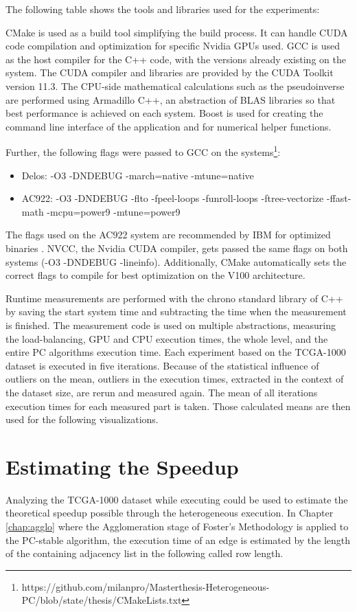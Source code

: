 The following table shows the tools and libraries used for the experiments:


CMake is used as a build tool simplifying the build process. It can handle CUDA code compilation and optimization for specific Nvidia GPUs used. GCC is used as the host compiler for the C++ code, with the versions already existing on the system. The CUDA compiler and libraries are provided by the CUDA Toolkit version 11.3. The CPU-side mathematical calculations such as the pseudoinverse are performed using Armadillo C++, an abstraction of BLAS libraries so that best performance is achieved on each system. Boost is used for creating the command line interface of the application and for numerical helper functions.

Further, the following flags were passed to GCC on the systems\footnote{https://github.com/milanpro/Masterthesis-Heterogeneous-PC/blob/state/thesis/CMakeLists.txt}:
\begin{itemize}
  \item Delos: -O3 -DNDEBUG -march=native -mtune=native
  \item AC922: -O3 -DNDEBUG -flto -fpeel-loops -funroll-loops -ftree-vectorize -ffast-math -mcpu=power9 -mtune=power9
\end{itemize}
The flags used on the AC922 system are recommended by IBM for optimized binaries \cite{LinuxIBMPower}. NVCC, the Nvidia CUDA compiler, gets passed the same flags on both systems (-O3 -DNDEBUG -lineinfo). Additionally, CMake automatically sets the correct flags to compile for best optimization on the V100 architecture.

Runtime measurements are performed with the chrono standard library of C++ by saving the start system time and subtracting the time when the measurement is finished. The measurement code is used on multiple abstractions, measuring the load-balancing, GPU and CPU execution times, the whole level, and the entire PC algorithms execution time.
Each experiment based on the TCGA-1000 dataset is executed in five iterations. Because of the statistical influence of outliers on the mean, outliers in the execution times, extracted in the context of the dataset size, are rerun and measured again. The mean of all iterations execution times for each measured part is taken. Those calculated means are then used for the following visualizations.

\section{Estimating the Speedup}
\label{chap:est_speedup}
Analyzing the TCGA-1000 dataset while executing could be used to estimate the theoretical speedup possible through the heterogeneous execution. In Chapter \ref{chap:agglo} where the Agglomeration stage of Foster's Methodology \cite{fosterDesigningBuildingParallel1995} is applied to the PC-stable algorithm, the execution time of an edge is estimated by the length of the containing adjacency list in the following called row length.

